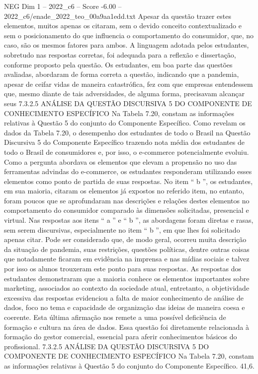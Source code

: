 \begin{textsample}{NEG Dim 1 – 2022\_c6 – Score -6.00 – 2022\_c6/enade\_2022\_teo\_00a9aa1edd.txt}
Apesar da questão trazer estes elementos, muitos apenas os citaram, sem o devido conceito contextualizado e sem o posicionamento do que influencia o comportamento do consumidor, que, no caso, são os mesmos fatores para ambos.
A linguagem adotada pelos estudantes, sobretudo nas respostas corretas, foi adequada para a reflexão e dissertação, conforme proposto pela questão.
Os estudantes, em boa parte das questões avaliadas, abordaram de forma correta a questão, indicando que a pandemia, apesar de ceifar vidas de maneira catastrófica, fez com que empresas entendessem que, mesmo diante de tais adversidades, de alguma forma, precisavam alcançar seus 7.3.2.5 ANÁLISE DA QUESTÃO DISCURSIVA 5 DO COMPONENTE DE CONHECIMENTO ESPECÍFICO Na Tabela 7.20, constam as informações relativas à Questão 5 do conjunto do Componente Específico.
Como revelam os dados da Tabela 7.20, o desempenho dos estudantes de todo o Brasil na Questão Discursiva 5 do Componente Específico trazendo nota média dos estudantes de todo o Brasil de consumidores e, por isso, o e-commerce potencialmente evoluiu.
Como a pergunta abordava os elementos que elevam a propensão no uso das ferramentas advindas do e-commerce, os estudantes responderam utilizando esses elementos como ponto de partida de suas respostas.
No item “ b ”, os estudantes, em sua maioria, citaram os elementos já expostos no referido item, no entanto, foram poucos que se aprofundaram nas descrições e relações destes elementos no comportamento do consumidor comparado às dimensões solicitadas, presencial e virtual.
Nas respostas aos itens “ a ” e “ b ”, as abordagens foram diretas e rasas, sem serem discursivas, especialmente no item “ b ”, em que lhes foi solicitado apenas citar.
Pode ser considerado que, de modo geral, ocorreu muita descrição da situação de pandemia, suas restrições, questões políticas, dentre outras coisas que notadamente ficaram em evidência na imprensa e nas mídias sociais e talvez por isso os alunos trouxeram este ponto para suas respostas.
As respostas dos estudantes demonstraram que a maioria conhece os elementos importantes sobre marketing, associados ao contexto da sociedade atual, entretanto, a objetividade excessiva das respostas evidenciou a falta de maior conhecimento de análise de dados, foco no tema e capacidade de organização das ideias de maneira coesa e coerente.
Esta última afirmação nos remete a uma possível deficiência de formação e cultura na área de dados.
Essa questão foi diretamente relacionada à formação do gestor comercial, essencial para aferir conhecimentos básicos do profissional. 7.3.2.5 ANÁLISE DA QUESTÃO DISCURSIVA 5 DO COMPONENTE DE CONHECIMENTO ESPECÍFICO Na Tabela 7.20, constam as informações relativas à Questão 5 do conjunto do Componente Específico. 41,6.

\end{textsample}
